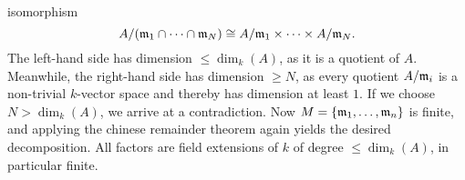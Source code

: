 \documentclass[a4paper,11pt]{article}
\begin{document}
\begin{enumerate}
        isomorphism
        \begin{equation*}
            A/(\mathfrak{m}_1\cap \dots \cap \mathfrak{m}_N) \cong A/\mathfrak{m}_1 \times \dots \times A/\mathfrak{m}_N.
        \end{equation*}
        The left-hand side has dimension $\leq \dim_k(A)$, as it is a quotient
        of $A$. Meanwhile, the right-hand side has dimension $\geq N$, as 
        every quotient $A/\mathfrak{m}_i$ is a non-trivial $k$-vector space and thereby
        has dimension at least $1$. If we choose $N > \dim_k(A)$, we arrive 
        at a contradiction. Now $M = \{\mathfrak{m}_1, \dots, \mathfrak{m}_n\}$ is finite, and applying
        the chinese remainder theorem again yields the desired decomposition. 
        All factors are field extensions of $k$ of degree $\leq \dim_k(A)$, in
        particular finite.
\end{enumerate}


\contactend
\end{document}
